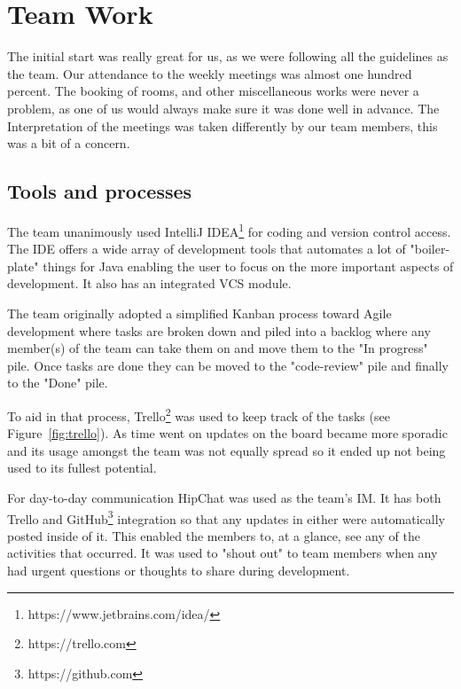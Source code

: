 \section{Team Work}
The initial start was really great for us, as we were following all the guidelines as the team. Our attendance to the weekly meetings was almost one hundred percent. The booking of rooms, and other miscellaneous works were never a problem, as one of us would always make sure it was done well in advance. The Interpretation of the meetings was taken differently by our team members, this was a bit of a concern.
\subsection{Tools and processes}

The team unanimously used IntelliJ IDEA\footnote{https://www.jetbrains.com/idea/} for coding and version control access. The IDE offers a wide array of development tools that automates a lot of "boiler-plate" things for Java enabling the user to focus on the more important aspects of development. It also has an integrated VCS module.

The team originally adopted a simplified Kanban\cite{Peterson2015, Radig2016} process toward Agile development where tasks are broken down and piled into a backlog where any member(s) of the team can take them on and move them to the "In progress" pile. Once tasks are done they can be moved to the "code-review" pile and finally to the "Done" pile.

To aid in that process, Trello\footnote{https://trello.com} was used to keep track of the tasks (see Figure~\ref{fig:trello}). As time went on updates on the board became more sporadic and its usage amongst the team was not equally spread so it ended up not being used to its fullest potential. 

For day-to-day communication HipChat was used as the team's IM. It has both Trello and GitHub\footnote{https://github.com} integration so that any updates in either were automatically posted inside of it. This enabled the members to, at a glance, see any of the activities that occurred. It was used to "shout out" to team members when any had urgent questions or thoughts to share during development.


